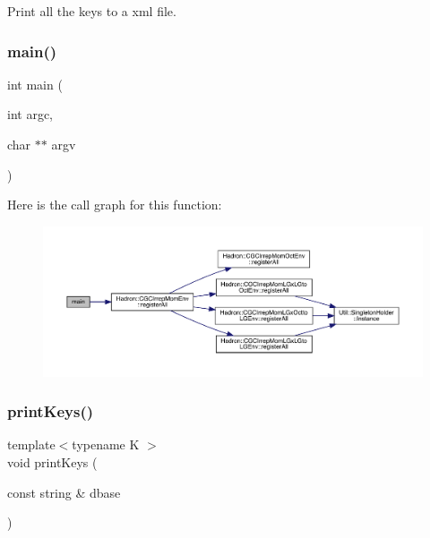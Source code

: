 Print all the keys to a xml file. 

\mbox{\label{adat-devel_2main_2dbutil_2dbkeys_8cc_a3c04138a5bfe5d72780bb7e82a18e627}} 
\subsubsection{\texorpdfstring{main()}{main()}}
{\footnotesize\ttfamily int main (\begin{DoxyParamCaption}\item[{int}]{argc,  }\item[{char $\ast$$\ast$}]{argv }\end{DoxyParamCaption})}

Here is the call graph for this function\+:
\nopagebreak
\begin{figure}[H]
\begin{center}
\leavevmode
\includegraphics[width=350pt]{d7/d1d/adat-devel_2main_2dbutil_2dbkeys_8cc_a3c04138a5bfe5d72780bb7e82a18e627_cgraph}
\end{center}
\end{figure}
\mbox{\label{adat-devel_2main_2dbutil_2dbkeys_8cc_a05c6483ffb9fa71112b451a5dd7eb935}} 
\subsubsection{\texorpdfstring{printKeys()}{printKeys()}}
{\footnotesize\ttfamily template$<$typename K $>$ \\
void print\+Keys (\begin{DoxyParamCaption}\item[{const string \&}]{dbase }\end{DoxyParamCaption})}



